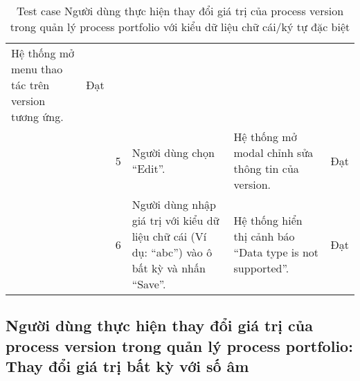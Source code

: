 \begin{table}[H]
{\begin{tabular}{|p{3cm}|p{1.5cm}|p{0.5cm}|p{4cm}|p{4cm}|>{\centering\arraybackslash}p{1cm}|}
            Hệ thống mở menu thao tác trên version tương ứng. &
            Đạt \\ \cline{3-6} 
            &
            &
            \multicolumn{1}{c|}{5} &
            Người dùng chọn “Edit”. &
            Hệ thống mở modal chỉnh sửa thông tin của version. &
            Đạt \\ \cline{3-6} 
            &
            &
            \multicolumn{1}{c|}{6} &
            Người dùng nhập giá trị với kiểu dữ liệu chữ cái (Ví dụ: “abc”) vào ô bất kỳ và nhấn “Save”. &
            Hệ thống hiển thị cảnh báo “Data type is not supported”. &
            Đạt \\ \cline{3-6} \hline
        \end{tabular}
    }
    \caption{Test case Người dùng thực hiện thay đổi giá trị của process version trong quản lý process portfolio với kiểu dữ liệu chữ cái/ký tự đặc biệt}
\end{table}

\subsection{Người dùng thực hiện thay đổi giá trị của process version trong quản lý process portfolio: Thay đổi giá trị bất kỳ với số âm}

